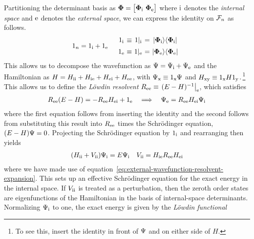 \documentclass[11pt]{article}
\numberwithin{equation}{section}
\begin{document}
\begin{rmk}
\label{rmk:lowdin-partitioning}
Partitioning the determinant basis as
$
  \bo{\F}
=
\pma{\bo{\F}_\mr{i}\ \bo{\F}_\mr{e}}
$
where $\mathrm{i}$ denotes the \textit{internal space} and $\mathrm{e}$ denotes the \textit{external space}, we can express the identity on $\mathcal{F}_n$ as follows.
\begin{align}
  1_n
=
  1_\mr{i}
+
  1_\mr{e}
&&
\begin{array}{c@{\ }c@{\ }c@{\ }c@{\ }c}
  1_\mr{i}
&
\equiv
&
  1|_\mr{i}
&
=
&
  \kt{\bo{\F}_\mr{i}}
  \br{\bo{\F}_\mr{i}}
\\[5pt]
  1_\mr{e}
&
\equiv
&
  1|_\mr{e}
&
=
&
  \kt{\bo{\F}_\mr{e}}
  \br{\bo{\F}_\mr{e}}
\end{array}
\end{align}
This allows us to decompose the wavefunction as
$
  \Psi 
=
  \Psi _{\mathrm{i}}
+
  \Psi _{\mathrm{e}}
$
and the Hamiltonian as
$
  H
=
  H_{\mathrm{ii}}
+
  H_{\mathrm{ie}}
+
  H_{\mathrm{ei}}
+
  H_{\mathrm{ee}}
$,
with
$
  \Psi _{\mathrm{x}}
\equiv
  1_{\mathrm{x}}
  \Psi 
$
and
$
  H_{\mathrm{xy}}
\equiv
  1_{\mathrm{x}}
  H
  1_{\mathrm{y}}
$.\,\footnote{To see this, insert the identity in front of $\Psi $ and on either side of $H$.}
This allows us to define the
\textit{L\"owdin resolvent}
$
  R_{\mathrm{ee}}
\equiv
  \left.
  (
    E
  -
    H
  )^{-1}
  \right|_{\mathrm{e}}
$,
which satisfies
\begin{align}
\label{eq:external-wavefunction-resolvent-expansion}
  R_{\mathrm{ee}}
  (
    E
  -
    H
  )
=
-
  R_{\mathrm{ee}}
  H_{\mathrm{ei}}
+
  1_{\mathrm{e}}
&&
  \implies
&&
  \Psi _{\mathrm{e}}
=
  R_{\mathrm{ee}}
  H_{\mathrm{ei}}
  \Psi _{\mathrm{i}}
\end{align}
where the first equation follows from inserting the identity and the second follows from substituting this result into $R_{\mathrm{ee}}$ times the Schr\"odinger equation,
$
  (
    E
  -
    H
  )
  \Psi 
=
  0
$.
Projecting the Schr\"odinger equation by $1_{\mathrm{i}}$ and rearranging then yields
\begin{align}
  (
    H_{\mathrm{ii}}
  +
    V_{\mathrm{ii}}
  )
  \Psi _{\mathrm{i}}
=
  E
  \Psi _{\mathrm{i}}
&&
  V_{\mathrm{ii}}
=
  H_{\mathrm{ie}}
  R_{\mathrm{ee}}
  H_{\mathrm{ei}}
\end{align}
where we have made use of equation~\ref{eq:external-wavefunction-resolvent-expansion}.
This sets up an effective Schr\"odinger equation for the exact energy in the internal space.
If $V_{\mathrm{ii}}$ is treated as a perturbation, then the zeroth order states are eigenfunctions of the Hamiltonian in the basis of internal-space determinants.
Normalizing $\Psi _{\mathrm{i}}$ to one, the exact energy is given by the
\textit{L\"owdin functional}

\end{rmk}
\end{document}
